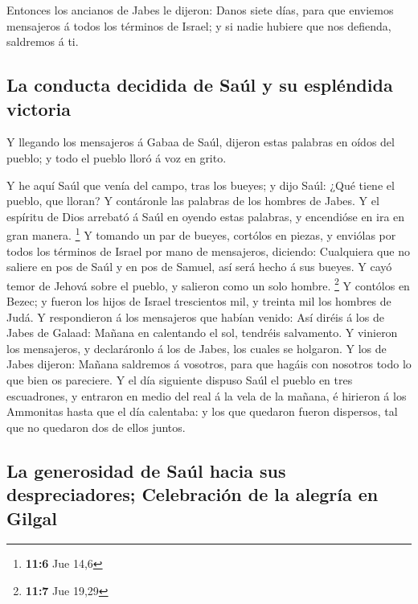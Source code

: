  Entonces los ancianos de Jabes le dijeron: Danos siete
días, para que enviemos mensajeros á todos los términos de Israel; y si
nadie hubiere que nos defienda, saldremos á ti.

\hypertarget{la-conducta-decidida-de-sauxfal-y-su-espluxe9ndida-victoria}{%
\subsection{La conducta decidida de Saúl y su espléndida
victoria}\label{la-conducta-decidida-de-sauxfal-y-su-espluxe9ndida-victoria}}

 Y llegando los mensajeros á Gabaa de Saúl, dijeron estas
palabras en oídos del pueblo; y todo el pueblo lloró á voz en grito.

 Y he aquí Saúl que venía del campo, tras los bueyes; y dijo
Saúl: ¿Qué tiene el pueblo, que lloran? Y contáronle las palabras de los
hombres de Jabes.  Y el espíritu de Dios arrebató á Saúl en
oyendo estas palabras, y encendióse en ira en gran manera. \footnote{\textbf{11:6}
  Jue 14,6}  Y tomando un par de bueyes, cortólos en piezas,
y enviólas por todos los términos de Israel por mano de mensajeros,
diciendo: Cualquiera que no saliere en pos de Saúl y en pos de Samuel,
así será hecho á sus bueyes. Y cayó temor de Jehová sobre el pueblo, y
salieron como un solo hombre. \footnote{\textbf{11:7} Jue 19,29}
 Y contólos en Bezec; y fueron los hijos de Israel
trescientos mil, y treinta mil los hombres de Judá.  Y
respondieron á los mensajeros que habían venido: Así diréis á los de
Jabes de Galaad: Mañana en calentando el sol, tendréis salvamento. Y
vinieron los mensajeros, y declaráronlo á los de Jabes, los cuales se
holgaron.  Y los de Jabes dijeron: Mañana saldremos á
vosotros, para que hagáis con nosotros todo lo que bien os pareciere.
 Y el día siguiente dispuso Saúl el pueblo en tres
escuadrones, y entraron en medio del real á la vela de la mañana, é
hirieron á los Ammonitas hasta que el día calentaba: y los que quedaron
fueron dispersos, tal que no quedaron dos de ellos juntos.

\hypertarget{la-generosidad-de-sauxfal-hacia-sus-despreciadores-celebraciuxf3n-de-la-alegruxeda-en-gilgal}{%
\subsection{La generosidad de Saúl hacia sus despreciadores; Celebración
de la alegría en
Gilgal}\label{la-generosidad-de-sauxfal-hacia-sus-despreciadores-celebraciuxf3n-de-la-alegruxeda-en-gilgal}}

